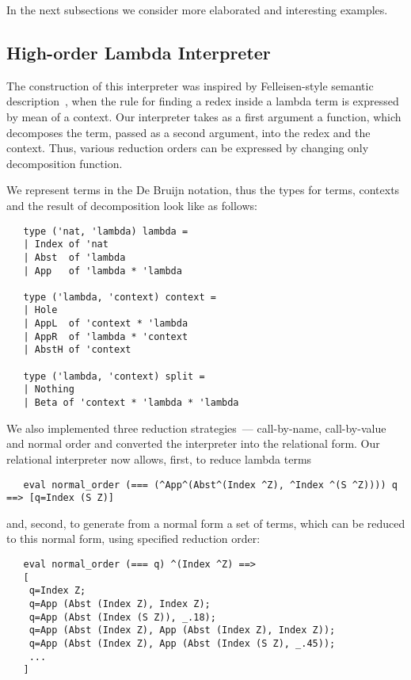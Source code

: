 In the next subsections we consider more elaborated and interesting examples.

\subsection{High-order Lambda Interpreter}

The construction of this interpreter was inspired by Felleisen-style semantic description~\cite{Felleisen}, when the rule for finding a redex
inside a lambda term is expressed by mean of a context. Our interpreter takes as a first argument a function, which decomposes the term, passed
as a second argument, into the redex and the context. Thus, various reduction orders can be expressed by changing only decomposition function.

We represent terms in the De Bruijn notation, thus the types for terms, contexts and the result of decomposition look like as follows:

\begin{lstlisting}
   type ('nat, 'lambda) lambda = 
   | Index of 'nat
   | Abst  of 'lambda
   | App   of 'lambda * 'lambda
  
   type ('lambda, 'context) context = 
   | Hole
   | AppL  of 'context * 'lambda
   | AppR  of 'lambda * 'context
   | AbstH of 'context

   type ('lambda, 'context) split = 
   | Nothing 
   | Beta of 'context * 'lambda * 'lambda
\end{lstlisting}

We also implemented three reduction strategies~--- call-by-name, call-by-value and normal order and converted 
the interpreter into the relational form. Our relational interpreter now allows, first, to reduce lambda terms

\begin{lstlisting}
   eval normal_order (=== (^App^(Abst^(Index ^Z), ^Index ^(S ^Z)))) q ==> [q=Index (S Z)]
\end{lstlisting}

and, second, to generate from a normal form a set of terms, which can be reduced to this normal form, using specified
reduction order:

\begin{lstlisting}
   eval normal_order (=== q) ^(Index ^Z) ==>              
   [
    q=Index Z; 
    q=App (Abst (Index Z), Index Z); 
    q=App (Abst (Index (S Z)), _.18); 
    q=App (Abst (Index Z), App (Abst (Index Z), Index Z)); 
    q=App (Abst (Index Z), App (Abst (Index (S Z), _.45)); 
    ...
   ]
\end{lstlisting}

